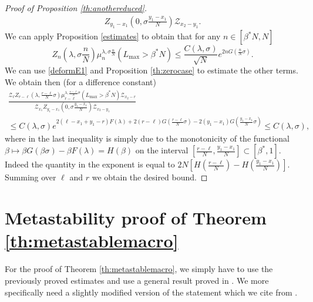 \documentclass[reqno,11pt]{amsart}
\numberwithin{equation}{section}
\newcommand{\gb}{\beta}
\newcommand{\gl}{\lambda}
\newcommand{\gs}{\sigma}
\newcommand{\cZ}{{\ensuremath{\mathcal Z}} }
\begin{document}
\begin{proof}[Proof of Proposition \ref{th:anothereduced}]
\begin{multline}
{ Z_{y_1-x_1}\left(0, \gs\frac{y_1-x_1}{N}\right) \cZ_{x_2-y_1}}.
 \end{multline}
We can apply  Proposition \ref{estimates} to obtain that for any $n\in [\beta^* N,N]$
\begin{equation}\label{deformE2}
Z_n\left(\gl, \gs\frac{n}{N}\right) \mu_{n}^{\gl, \gs\frac{n}{N}}\left(L_{\max}> \gb^*N \right) \le \frac{ C(\gl, \gs)} {\sqrt{N}} e^{2n G(\frac{n}{N} \gs)}.
\end{equation}
We can use \eqref{deformE1} and Proposition \ref{th:zerocase} to estimate the other terms. We obtain then (for a difference constant)
\begin{multline}
\frac{\cZ_{\ell} 
 Z_{r-\ell}\left(\gl, \frac{r-\ell}{N} \gs\right) \mu_{r-\ell}^{\gl, \frac{r-\ell}{N}\gs} \left( L_{\max} > \gb^*N \right) \cZ_{x_2-r} }{ \cZ_{x_1} 
 Z_{y_1-x_1}\left(0, \gs\frac{y_1-x_1}{N}\right) \cZ_{x_2-y_1}}
 \\ \le C(\gl,\sigma)e^{2(\ell-x_1+y_1-r)F(\gl)+2(r-\ell) G(\frac{r-\ell}{N} \gs)- 2(y_1-x_1) G(\frac{y_1-x_1}{N} \gs)}\le  C(\gl,\sigma),
\end{multline}
where in the last inequality is simply due to the monotonicity of the functional
$\beta \mapsto \beta G(\beta\sigma)- \beta F(\gl)=H(\beta)$ on the interval $\left[ \frac{r-\ell}{N},\frac{y_1-x_1}{N}\right]\subset [\beta^*, 1]$. 
Indeed the quantity in the exponent is equal to $2N[   H\left(\frac{r-\ell}{N}\right)-H\left(\frac{y_1-x_1}{N}\right)]$.
 Summing over $\ell$ and $r$ we obtain the desired bound.



\end{proof}























\section{Metastability proof of Theorem \ref{th:metastablemacro}}\label{sec:metastab}

For the proof of  Theorem \ref{th:metastablemacro}, we simply have to use the previously proved estimates and use a general result proved in  \cite{beltran2015martingale}.
We more specifically need a slightly modified version of the statement which we cite from
\cite{lacoin2015mathematical}.
\end{document}
